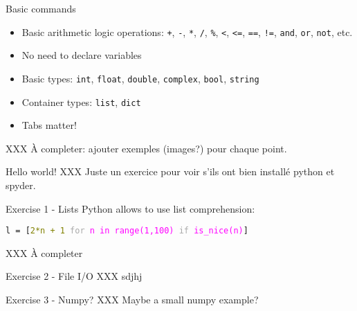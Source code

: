 \documentclass{beamer}
\begin{document}
	\begin{frame}{Basic commands}
		\begin{itemize}
			\item Basic arithmetic logic operations: \texttt{+}, \texttt{-}, \texttt{*}, \texttt{/}, \texttt{\%}, \texttt{<}, \texttt{<=}, \texttt{==}, \texttt{!=}, \texttt{and}, \texttt{or}, \texttt{not}, etc.
			\item No need to declare variables
			\item Basic types: \texttt{int}, \texttt{float}, \texttt{double}, \texttt{complex}, \texttt{bool}, \texttt{string}
			\item Container types: \texttt{list}, \texttt{dict}
			\item Tabs matter!
		\end{itemize}
	
		XXX À completer: ajouter exemples (images?) pour chaque point.
		
	\end{frame}

	\begin{frame}{Hello world!}
		XXX Juste un exercice pour voir s'ils ont bien installé python et spyder.
	\end{frame}

	\begin{frame}{Exercise 1 - Lists}
		Python allows to use list comprehension:
		
		\texttt{l = [\textcolor{olive}{2*n + 1} \textcolor{darkgray}{for} \textcolor{magenta}{n in range(1,100)} \textcolor{darkgray}{if} \textcolor{magenta}{is\_nice(n)}]}
	
		XXX À completer
	\end{frame}

	\begin{frame}{Exercise 2 - File I/O}
		XXX sdjhj
	\end{frame}

	\begin{frame}{Exercise 3 - Numpy?}
		XXX Maybe a small numpy example?
	\end{frame}
\end{document}
